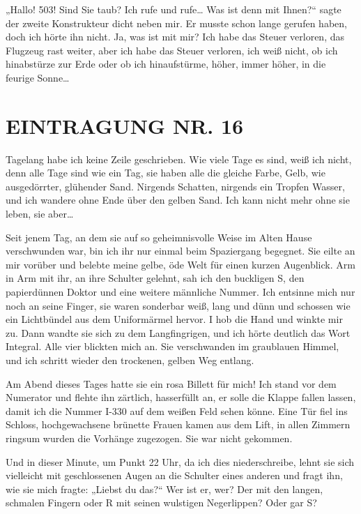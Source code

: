 „Hallo! 503! Sind Sie taub? Ich rufe und rufe\ldots{} Was ist denn mit
Ihnen?“ sagte der zweite Konstrukteur dicht neben mir. Er musste
schon lange gerufen haben, doch ich hörte ihn nicht. Ja, was ist
mit mir? Ich habe das Steuer verloren, das Flugzeug rast weiter,
aber ich habe das Steuer verloren, ich weiß nicht, ob ich
hinabstürze zur Erde oder ob ich hinaufstürme, höher, immer höher,
in die feurige Sonne\ldots{}

\section{EINTRAGUNG NR. 16}

Tagelang habe ich keine Zeile geschrieben. Wie viele Tage es sind,
weiß ich nicht, denn alle Tage sind wie ein Tag, sie haben alle die
gleiche Farbe, Gelb, wie ausgedörrter, glühender Sand. Nirgends
Schatten, nirgends ein Tropfen Wasser, und ich wandere ohne Ende
über den gelben Sand. Ich kann nicht mehr ohne sie leben, sie
aber\ldots{}

Seit jenem Tag, an dem sie auf so geheimnisvolle Weise im
Alten Hause verschwunden war, bin ich ihr nur einmal beim
Spaziergang begegnet. Sie eilte an mir vorüber und belebte meine
gelbe, öde Welt für einen kurzen Augenblick. Arm in Arm mit ihr, an
ihre Schulter gelehnt, sah ich den buckligen S, den papierdünnen
Doktor und eine weitere männliche Nummer. Ich entsinne mich nur
noch an seine Finger, sie waren sonderbar weiß, lang und dünn und
schossen wie ein Lichtbündel aus dem Uniformärmel hervor. I hob
die Hand und winkte mir zu. Dann wandte sie sich zu dem
Langfingrigen, und ich hörte deutlich das Wort Integral. Alle vier
blickten mich an. Sie verschwanden im graublauen Himmel, und ich
schritt wieder den trockenen, gelben Weg entlang.

Am Abend dieses Tages hatte sie ein rosa Billett für mich! Ich
stand vor dem Numerator und flehte ihn zärtlich, hasserfüllt an, er
solle die Klappe fallen lassen, damit ich die Nummer I-330 auf dem
weißen Feld sehen könne. Eine Tür fiel ins Schloss, hochgewachsene
brünette Frauen kamen aus dem Lift, in allen Zimmern ringsum wurden
die Vorhänge zugezogen. Sie war nicht gekommen.

Und in dieser
Minute, um Punkt 22 Uhr, da ich dies
niederschreibe, lehnt sie sich vielleicht mit geschlossenen Augen
an die Schulter eines anderen und fragt ihn, wie sie mich fragte:
„Liebst du das?“ Wer ist er, wer? Der mit den langen, schmalen
Fingern oder R mit seinen wulstigen Negerlippen? Oder gar S?

